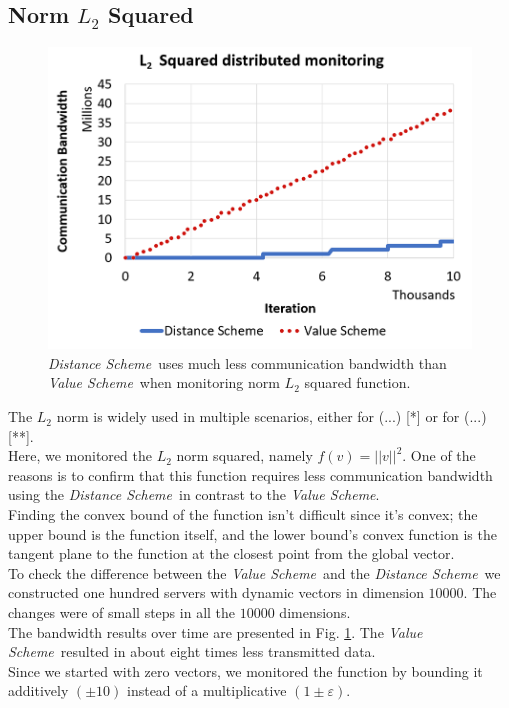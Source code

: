 \documentclass[10pt, conference]{IEEEtran}
\newcommand{\valueScheme}{\textit{Value Scheme}}
\newcommand{\distanceScheme}{\textit{Distance Scheme}}
\begin{document}
\subsection{Norm $L_2$ Squared} \label{L2SquaredExperiment}
\begin{figure}[t]
\includegraphics[width=\linewidth]{Pics/PNGs/L2NormCommunicationDiagram.png}
\caption{\distanceScheme \ uses much less communication bandwidth than \valueScheme \ when monitoring norm $L_2$ squared function.}
\label{SphereMonitoring}
\end{figure} 
The $L_2$ norm is widely used in multiple scenarios, either for (...) [*] or for (...) [**]. \\
Here, we monitored the $L_2$ norm squared, namely ${f(v) = ||v||^2}$. One of the reasons is to confirm that this function requires less communication bandwidth using the \distanceScheme \ in contrast to the \valueScheme . \\
Finding the convex bound of the function isn't difficult since it's convex; the upper bound is the function itself, and the lower bound's convex function is the tangent plane to the function at the closest point from the global vector. \\
To check the difference between the \valueScheme \ and the \distanceScheme \ we constructed one hundred servers with dynamic vectors in dimension $\num[group-separator={,}]{10000}$. The changes were of small steps in all the $\num[group-separator={,}]{10000}$ dimensions. \\
The bandwidth results over time are presented in Fig. \ref{SphereMonitoring}. The \valueScheme \ resulted in about eight times less transmitted data. \\
Since we started with zero vectors, we monitored the function by bounding it additively ${(\pm 10)}$ instead of a multiplicative ${(1 \pm \varepsilon)}$.
\end{document}
